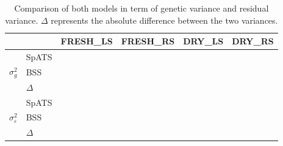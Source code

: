 \begin{table}[htbp]
  \centering
  \caption[Comparison of both models in term of genetic variance and residual variance]{Comparison of both models in term of genetic variance and residual variance. $\Delta$ represents the absolute difference between the two variances. }
    \begin{tabular}{clrrrr}
    \toprule
          &       & \multicolumn{1}{l}{FRESH\_LS} & \multicolumn{1}{l}{FRESH\_RS} & \multicolumn{1}{l}{DRY\_LS} & \multicolumn{1}{l}{DRY\_RS} \\
    \midrule
    \multirow{3}[2]{*}{$\sigma^2_{g}$} & SpATS &       &       &       &  \\
          & BSS   &       &       &       &  \\
          & $\Delta$ &       &       &       &  \\
    \midrule
    \multirow{3}[2]{*}{$\sigma^2_{\varepsilon}$} & SpATS &       &       &       &  \\
          & BSS   &       &       &       &  \\
          & $\Delta$ &       &       &       &  \\
    \bottomrule
    \end{tabular}%
  \label{tab:sigma_model_comparison}%
\end{table}%

